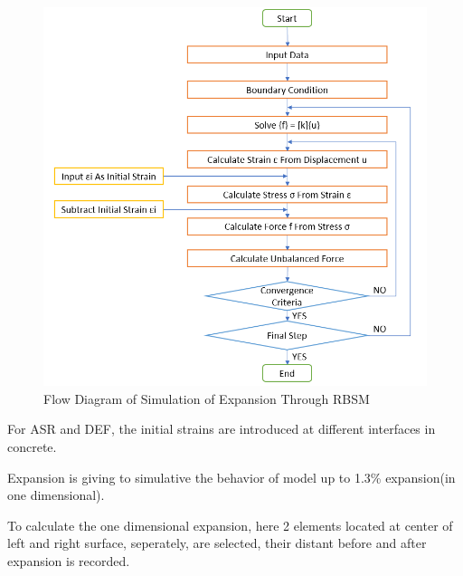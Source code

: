 \begin{figure}[ht!]
    \centering
    \includegraphics[width=1.0\linewidth]{Files/Method/flow.png}
    \caption{Flow Diagram of Simulation of Expansion Through RBSM}
    \label{fig:Flow}
\end{figure}


For ASR and DEF, the initial strains are introduced at different interfaces in concrete.

Expansion is giving to simulative the behavior of model up to 1.3\% expansion(in one dimensional).

To calculate the one dimensional expansion, here 2 elements located at center of left and right surface, seperately, are selected, their distant before and after expansion is recorded.

